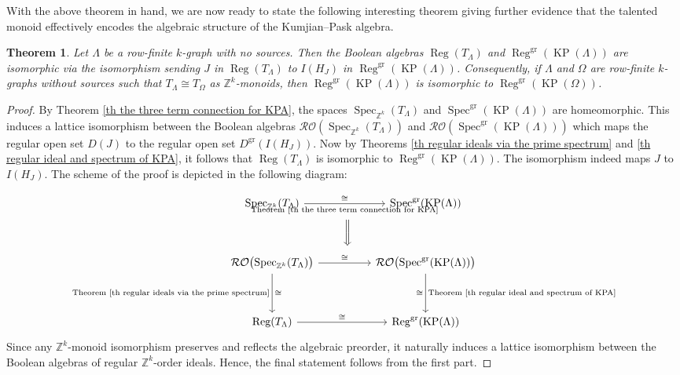 \documentclass[a4paper,reqno,12pt]{amsart}
\numberwithin{equation}{section}
\newtheorem{thm}{Theorem}[section]
\theoremstyle{definition}
\theoremstyle{remark}
\newcommand{\Spec}{\operatorname{Spec}}
\newcommand{\reg}{\operatorname{Reg}}
\newcommand{\gr}{\operatorname{gr}}
\newcommand{\KP}{\operatorname{KP}}
\begin{document}
With the above theorem in hand, we are now ready to state the following interesting theorem giving further evidence that the talented monoid effectively encodes the algebraic structure of the Kumjian--Pask algebra.

\begin{thm}\label{th lattice isomorphism of regular ideals via TM}
Let $\Lambda$ be a row-finite $k$-graph with no sources. Then the Boolean algebras $\reg(T_\Lambda)$ and $\reg^{\gr}(\KP(\Lambda))$ are isomorphic via the isomorphism sending $J$ in $\reg(T_\Lambda)$ to $I(H_J)$ in $\reg^{\gr}(\KP(\Lambda))$. Consequently, if $\Lambda$ and $\Omega$ are row-finite $k$-graphs without sources such that $T_\Lambda\cong T_\Omega$ as $\mathbb{Z}^k$-monoids, then $\reg^{\gr}(\KP(\Lambda))$ is isomorphic to $\reg^{\gr}(\KP(\Omega))$. 
\end{thm}
\begin{proof}
By Theorem \ref{th the three term connection for KPA}, the spaces $\Spec_{\mathbb{Z}^k}(T_\Lambda)$ and $\Spec^{\gr}(\KP(\Lambda))$ are homeomorphic. This induces a lattice isomorphism between the Boolean algebras $\mathcal{R}\mathcal{O}(\Spec_{\mathbb{Z}^k}(T_\Lambda))$ and $\mathcal{R}\mathcal{O}(\Spec^{\gr}(\KP(\Lambda)))$ which maps the regular open set $D(J)$ to the regular open set $D^{\gr}(I(H_J))$. Now by Theorems \ref{th regular ideals via the prime spectrum} and \ref{th regular ideal and spectrum of KPA}, it follows that $\reg(T_\Lambda)$ is isomorphic to $\reg^{\gr}(\KP(\Lambda))$. The isomorphism indeed maps $J$ to $I(H_J)$. The scheme of the proof is depicted in the following diagram:

\[
\begin{tikzcd}[row sep=huge, column sep=huge]
\text{Spec}_{\mathbb{Z}^k}(T_{\Lambda}) \arrow[r, "\cong", "\text{Theorem \ref{th the three term connection for KPA}}"'] \arrow[dr, phantom, "\bigg\Downarrow"] & \text{Spec}^{\text{gr}}(\KP(\Lambda)) \\
\mathcal{RO}\big(\text{Spec}_{\mathbb{Z}^k}(T_{\Lambda})\big) \arrow[r, "\cong"] \arrow[d, "\text{Theorem \ref{th regular ideals via the prime spectrum}}"', "\cong"] & \mathcal{RO}\big(\text{Spec}^{\text{gr}}(\KP(\Lambda))\big) \arrow[d, "\cong"', "\text{Theorem \ref{th regular ideal and spectrum of KPA}}"] \\
\text{Reg}(T_{\Lambda}) \arrow[r, "\cong"] & \text{Reg}^{\text{gr}}(\KP(\Lambda))
\end{tikzcd}
\]
Since any $\mathbb{Z}^k$-monoid isomorphism preserves and reflects the algebraic preorder, it naturally induces a lattice isomorphism between the Boolean algebras of regular $\mathbb{Z}^k$-order ideals. Hence, the final statement follows from the first part.
\end{proof}
\end{document}
